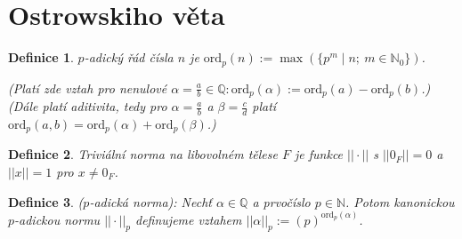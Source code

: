 \documentclass[10pt,a4paper]{article}
\newcommand{\Q}{{\mathbb{Q}}}       %
\newcommand{\N}{{\mathbb{N}}}       %
\newcommand{\ord}{\text{ord}}   	%
\newcommand{\norm}[1]{\left|\left| #1 \right|\right|}	%
\newtheorem{Def}{Definice}[section]
\begin{document}
\section{Ostrowskiho věta}

\begin{Def} $p$-adický řád \normalfont čísla $n$ je $\ord_p(n) := \max(\{p^m \mid n;~  m \in \N_0 \})$. 
	
	\textit{(Platí zde vztah pro nenulové }$\alpha = \frac{a}{b} \in \Q: \ord_p(\alpha) := \ord_p(a) - \ord_p(b)$.\textit{)}\\
	\textit{(Dále platí aditivita, tedy pro }$\alpha = \frac ab$ a $ \beta  = \frac cd $ \textit{platí} $\ord_p(a,b)=\ord_p(\alpha)+\ord_p(\beta)$.\textit{)}
\end{Def}

\begin{Def} Triviální norma \normalfont na libovolném tělese $F$ je funkce $||\cdot ||$ s $||0_F||=0$ a $||x||=1$ pro $x\neq 0_F$.
\end{Def}

\begin{Def} ($ p $-adická norma): \normalfont Nechť $\alpha \in \Q$ a prvočíslo $p\in \N$. 
	Potom \textit{kanonickou $ p $-adickou normu} $||\cdot ||_p$ definujeme vztahem $\norm{\alpha}_p := \left(p\right)^{\ord_p(\alpha)}$.
\end{Def}
\end{document}
